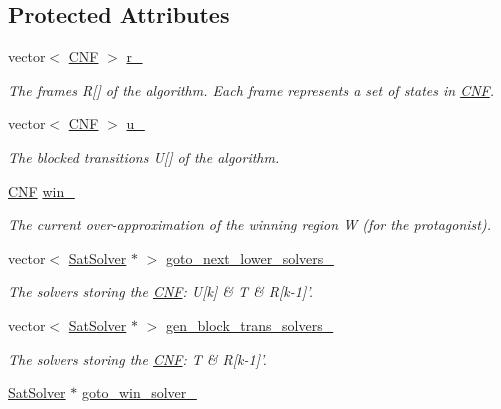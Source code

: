 \subsection*{Protected Attributes}
\begin{DoxyCompactItemize}
\item 
vector$<$ \hyperlink{classCNF}{C\-N\-F} $>$ \hyperlink{classIFM13Synth_a10aead75cfca1b96cdd6c17f6825a9b7}{r\-\_\-}
\begin{DoxyCompactList}\small\item\em The frames R\mbox{[}\mbox{]} of the algorithm. Each frame represents a set of states in \hyperlink{classCNF}{C\-N\-F}. \end{DoxyCompactList}\item 
vector$<$ \hyperlink{classCNF}{C\-N\-F} $>$ \hyperlink{classIFM13Synth_a493a9f0a3f2880597a89d48766706099}{u\-\_\-}
\begin{DoxyCompactList}\small\item\em The blocked transitions U\mbox{[}\mbox{]} of the algorithm. \end{DoxyCompactList}\item 
\hyperlink{classCNF}{C\-N\-F} \hyperlink{classIFM13Synth_ab6b54169dc042466704a4e6ceee4e94d}{win\-\_\-}
\begin{DoxyCompactList}\small\item\em The current over-\/approximation of the winning region W (for the protagonist). \end{DoxyCompactList}\item 
vector$<$ \hyperlink{classSatSolver}{Sat\-Solver} $\ast$ $>$ \hyperlink{classIFM13Synth_a4b964deefde7cd2cc4d81c8ea6f66976}{goto\-\_\-next\-\_\-lower\-\_\-solvers\-\_\-}
\begin{DoxyCompactList}\small\item\em The solvers storing the \hyperlink{classCNF}{C\-N\-F}\-: U\mbox{[}k\mbox{]} \& T \& R\mbox{[}k-\/1\mbox{]}'. \end{DoxyCompactList}\item 
vector$<$ \hyperlink{classSatSolver}{Sat\-Solver} $\ast$ $>$ \hyperlink{classIFM13Synth_a950a68d4f0efeca411ead2d4439aed9d}{gen\-\_\-block\-\_\-trans\-\_\-solvers\-\_\-}
\begin{DoxyCompactList}\small\item\em The solvers storing the \hyperlink{classCNF}{C\-N\-F}\-: T \& R\mbox{[}k-\/1\mbox{]}'. \end{DoxyCompactList}\item 
\hyperlink{classSatSolver}{Sat\-Solver} $\ast$ \hyperlink{classIFM13Synth_a08f52e41085966317cfc516bd52dc3b3}{goto\-\_\-win\-\_\-solver\-\_\-}

\end{DoxyCompactItemize}

